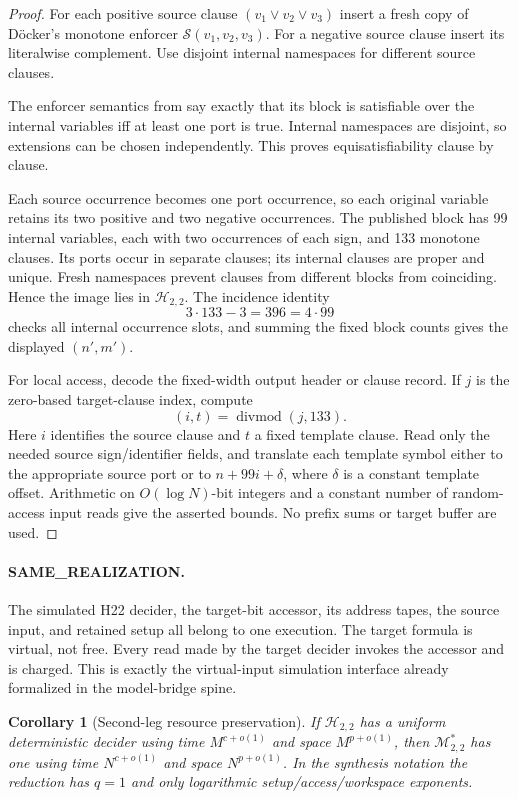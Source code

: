 \documentclass[11pt]{article}
\newtheorem{corollary}{Corollary}
\begin{document}
\begin{proof}
For each positive source clause $(v_1\vee v_2\vee v_3)$ insert a fresh copy
of D\"ocker's monotone enforcer $\mathcal S(v_1,v_2,v_3)$.  For a negative
source clause insert its literalwise complement.  Use disjoint internal
namespaces for different source clauses.

The enforcer semantics from \cite{Doecker19} say exactly that its block is
satisfiable over the internal variables iff at least one port is true.
Internal namespaces are disjoint, so extensions can be chosen independently.
This proves equisatisfiability clause by clause.

Each source occurrence becomes one port occurrence, so each original variable
retains its two positive and two negative occurrences.  The published block
has 99 internal variables, each with two occurrences of each sign, and 133
monotone clauses.  Its ports occur in separate clauses; its internal clauses
are proper and unique.  Fresh namespaces prevent clauses from different
blocks from coinciding.  Hence the image lies in $\mathcal H_{2,2}$.
The incidence identity
\[
 3\cdot133-3=396=4\cdot99
\]
checks all internal occurrence slots, and summing the fixed block counts gives
the displayed $(n',m')$.

For local access, decode the fixed-width output header or clause record.  If
$j$ is the zero-based target-clause index, compute
\[
 (i,t)=\operatorname{divmod}(j,133).
\]
Here $i$ identifies the source clause and $t$ a fixed template clause.  Read
only the needed source sign/identifier fields, and translate each template
symbol either to the appropriate source port or to
$n+99i+\delta$, where $\delta$ is a constant template offset.  Arithmetic on
$O(\log N)$-bit integers and a constant number of random-access input reads
give the asserted bounds.  No prefix sums or target buffer are used.
\end{proof}

\paragraph{SAME\_REALIZATION.}
The simulated H22 decider, the target-bit accessor, its address tapes, the
source input, and retained setup all belong to one execution.  The target
formula is virtual, not free.  Every read made by the target decider invokes
the accessor and is charged.  This is exactly the virtual-input simulation
interface already formalized in the model-bridge spine.

\begin{corollary}[Second-leg resource preservation]
If $\mathcal H_{2,2}$ has a uniform deterministic decider using time
$M^{c+o(1)}$ and space $M^{p+o(1)}$, then $\mathcal M^{*}_{2,2}$ has one using
time $N^{c+o(1)}$ and space $N^{p+o(1)}$.  In the synthesis notation the
reduction has $q=1$ and only logarithmic setup/access/workspace exponents.
\end{corollary}
\end{document}
